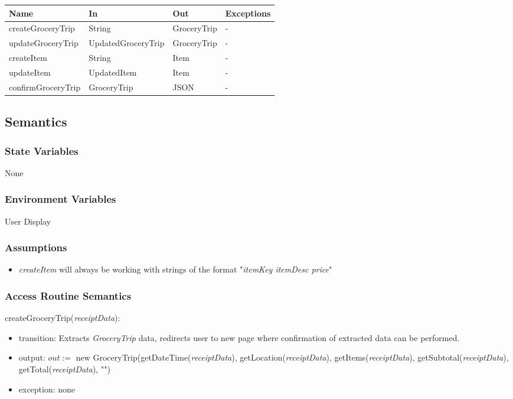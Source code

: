 \documentclass[12pt, titlepage]{article}
\begin{document}
\begin{center}
  \begin{tabular}{p{5cm} p{4cm} p{3cm} p{4cm}}
  \hline
  \textbf{Name} & \textbf{In} & \textbf{Out} & \textbf{Exceptions} \\
  \hline
  createGroceryTrip & String & GroceryTrip & -\\
  updateGroceryTrip & UpdatedGroceryTrip & GroceryTrip & -\\
  createItem & String & Item & -\\
  updateItem & UpdatedItem & Item & -\\
  confirmGroceryTrip & GroceryTrip & JSON & -\\
  \hline
  \end{tabular}
\end{center}

\subsection{Semantics}

\subsubsection{State Variables}

None

\subsubsection{Environment Variables}

User Display

\subsubsection{Assumptions}
\begin{itemize}
  \item \textit{createItem} will always be working with strings of the format "\textit{itemKey itemDesc price}"
\end{itemize}

\subsubsection{Access Routine Semantics}

\noindent createGroceryTrip(\textit{receiptData}):
\begin{itemize}
  \item transition: Extracts \textit{GroceryTrip} data, redirects user to new page where confirmation
of extracted data can be performed.
  \item output: $out :=$ new GroceryTrip(getDateTime(\textit{receiptData}), getLocation(\textit{receiptData}),
                        getItems(\textit{receiptData}), getSubtotal(\textit{receiptData}), getTotal(\textit{receiptData}), "")
  \item exception: none
\end{itemize}
\end{document}
